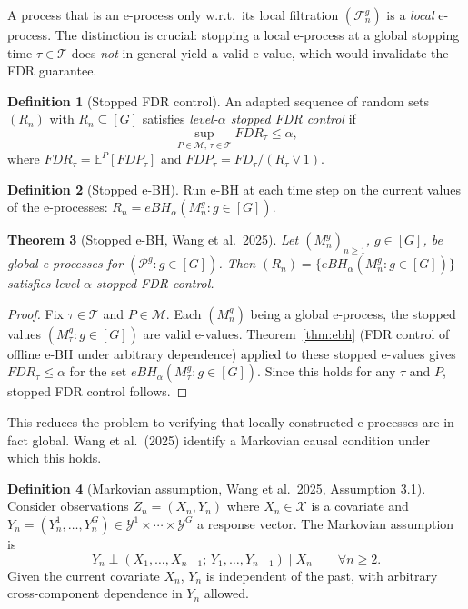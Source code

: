 \documentclass[11pt,a4paper]{article}
\theoremstyle{plain}
\newtheorem{theorem}{Theorem}[section]
\theoremstyle{definition}
\newtheorem{definition}[theorem]{Definition}
\theoremstyle{remark}
\newcommand{\E}{\mathbb{E}}
\begin{document}
A process that is an e-process only w.r.t.\ its local filtration
$(\mathcal{F}_n^g)$ is a \emph{local} e-process. The distinction is crucial:
stopping a local e-process at a global stopping time $\tau \in \mathcal{T}$
does \emph{not} in general yield a valid e-value, which would invalidate the
FDR guarantee.

\begin{definition}[Stopped FDR control]
An adapted sequence of random sets $(R_n)$ with $R_n \subseteq [G]$
satisfies \emph{level-$\alpha$ stopped FDR control} if
\[
  \sup_{P \in \mathcal{M},\, \tau \in \mathcal{T}} FDR_\tau \leq \alpha,
\]
where $FDR_\tau = \E^P[FDP_\tau]$ and $FDP_\tau = FD_\tau / (R_\tau \vee 1)$.
\end{definition}

\begin{definition}[Stopped e-BH]
Run e-BH at each time step on the current values of the e-processes:
$R_n = eBH_\alpha(M_n^g : g \in [G])$.
\end{definition}

\begin{theorem}[Stopped e-BH, Wang et al.\ 2025]\label{thm:stopped}
Let $(M_n^g)_{n \geq 1}$, $g \in [G]$, be global e-processes for
$(\mathcal{P}^g : g \in [G])$. Then $(R_n) = \{eBH_\alpha(M_n^g : g \in [G])\}$
satisfies level-$\alpha$ stopped FDR control.
\end{theorem}

\begin{proof}
Fix $\tau \in \mathcal{T}$ and $P \in \mathcal{M}$. Each $(M_n^g)$ being a
global e-process, the stopped values $(M_\tau^g : g \in [G])$ are valid
e-values. Theorem~\ref{thm:ebh} (FDR control of offline e-BH under arbitrary
dependence) applied to these stopped e-values gives $FDR_\tau \leq \alpha$
for the set $eBH_\alpha(M_\tau^g : g \in [G])$. Since this holds for any
$\tau$ and $P$, stopped FDR control follows.
\end{proof}

This reduces the problem to verifying that locally constructed e-processes
are in fact global. Wang et al.\ (2025) identify a Markovian causal
condition under which this holds.

\begin{definition}[Markovian assumption, Wang et al.\ 2025, Assumption 3.1]
Consider observations $Z_n = (X_n, Y_n)$ where $X_n \in \mathcal{X}$ is a
covariate and $Y_n = (Y_n^1, \ldots, Y_n^G) \in \mathcal{Y}^1 \times \cdots
\times \mathcal{Y}^G$ a response vector. The Markovian assumption is
\[
  Y_n \perp (X_1, \ldots, X_{n-1};\, Y_1, \ldots, Y_{n-1}) \mid X_n
  \qquad \forall n \geq 2.
\]
Given the current covariate $X_n$, $Y_n$ is independent of the past, with
arbitrary cross-component dependence in $Y_n$ allowed.
\end{definition}
\end{document}
